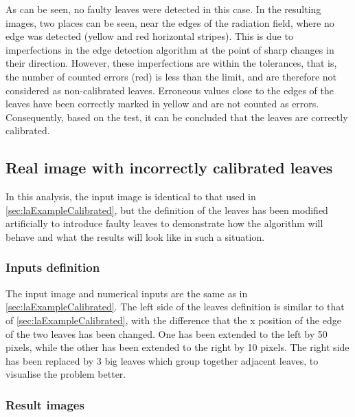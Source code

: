 As can be seen, no faulty leaves were detected in this case. In the resulting images, two places can be seen, near the edges of the radiation field, where no edge was detected (yellow and red horizontal stripes). This is due to imperfections in the edge detection algorithm at the point of sharp changes in their direction. However, these imperfections are within the tolerances, that is, the number of counted errors (red) is less than the limit, and are therefore not considered as non-calibrated leaves. Erroneous values close to the edges of the leaves have been correctly marked in yellow and are not counted as errors. Consequently, based on the test, it can be concluded that the leaves are correctly calibrated.

\subsection{Real image with incorrectly calibrated leaves}

In this analysis, the input image is identical to that used in \autoref{sec:laExampleCalibrated}, but the definition of the leaves has been modified artificially to introduce faulty leaves to demonstrate how the algorithm will behave and what the results will look like in such a situation.

\subsubsection{Inputs definition}

The input image and numerical inputs are the same as in \autoref{sec:laExampleCalibrated}. The left side of the leaves definition is similar to that of \autoref{sec:laExampleCalibrated}, with the difference that the x position of the edge of the two leaves has been changed. One has been extended to the left by 50 pixels, while the other has been extended to the right by 10 pixels. The right side has been replaced by 3 big leaves which group together adjacent leaves, to visualise the problem better.

\subsubsection{Result images}

